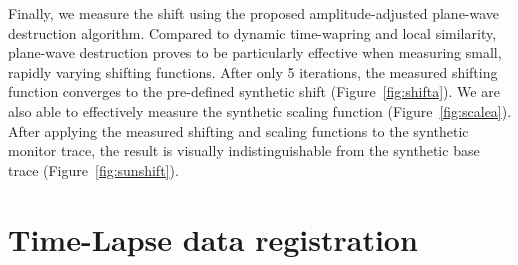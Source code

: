Finally, we measure the shift using the proposed amplitude-adjusted plane-wave 
destruction algorithm. Compared to dynamic time-wapring and local similarity, 
plane-wave destruction proves to be particularly effective when measuring 
small, rapidly varying shifting functions. After only 5 iterations, the 
measured shifting function converges to the pre-defined synthetic shift 
(Figure~\ref{fig:shifta}). We are also able to effectively measure the 
synthetic scaling function (Figure~\ref{fig:scalea}). After applying the 
measured shifting and scaling functions to the synthetic monitor trace, the 
result is visually indistinguishable from the synthetic base trace 
(Figure~\ref{fig:sunshift}).

 


\section{Time-Lapse data registration}


